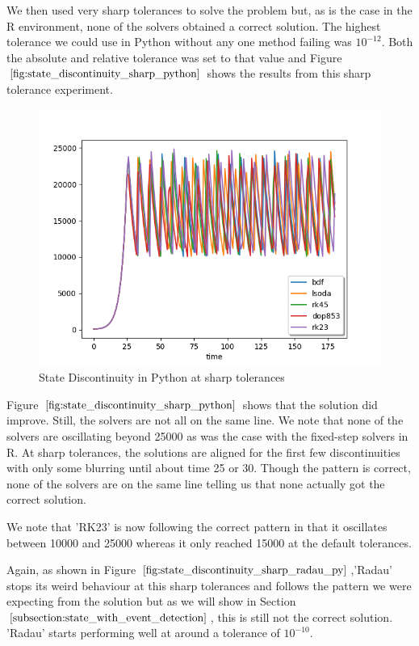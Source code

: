 We then used very sharp tolerances to solve the problem but, as is the case in the R environment, none of the solvers obtained a correct solution. The highest tolerance we could use in Python without any one method failing was $10^{-12}$. Both the absolute and relative tolerance was set to that value and Figure $\ref{fig:state_discontinuity_sharp_python}$ shows the results from this sharp tolerance experiment.

\begin{figure}[h]
	\centering
	\includegraphics[width=0.7\linewidth]{./figures/state_discontinuity_sharp_py}
	\caption{State Discontinuity in Python at sharp tolerances}
	\label{fig:state_discontinuity_sharp_python}
\end{figure}

Figure $\ref{fig:state_discontinuity_sharp_python}$ shows that the solution did improve. Still, the solvers are not all on the same line. We note that none of the solvers are oscillating beyond 25000 as was the case with the fixed-step solvers in R. At sharp tolerances, the solutions are aligned for the first few discontinuities with only some blurring until about time 25 or 30. Though the pattern is correct, none of the solvers are on the same line telling us that none actually got the correct solution.

We note that 'RK23' is now following the correct pattern in that it oscillates between 10000 and 25000 whereas it only reached 15000 at the default tolerances. 

Again, as shown in Figure $\ref{fig:state_discontinuity_sharp_radau_py}$,'Radau' stops its weird behaviour at this sharp tolerances and follows the pattern we were expecting from the solution but as we will show in Section $\ref{subsection:state_with_event_detection}$, this is still not the correct solution. 'Radau' starts performing well at around a tolerance of $10^{-10}$.

